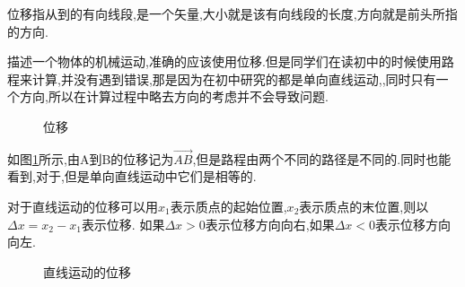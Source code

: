 位移指从到的有向线段,是一个矢量,大小就是该有向线段的长度,方向就是前头所指的方向.

描述一个物体的机械运动,准确的应该使用位移.但是同学们在读初中的时候使用路程来计算,并没有遇到错误,那是因为在初中研究的都是单向直线运动,,同时只有一个方向,所以在计算过程中略去方向的考虑并不会导致问题.

\begin{figure}[H]
  \centering
  \caption{位移}
  \label{fig:displacement}
\end{figure}

如图\ref{fig:displacement}所示,由A到B的位移记为$\overrightarrow{AB}$,但是路程由两个不同的路径是不同的.同时也能看到,对于,但是单向直线运动中它们是相等的.

对于直线运动的位移可以用$x_1$表示质点的起始位置,$x_2$表示质点的末位置,则以$\Delta x=x_2-x_1$表示位移.
如果$\Delta x>0$表示位移方向向右,如果$\Delta x<0$表示位移方向向左.

\begin{figure}[H]
  \centering
  \caption{直线运动的位移}
\end{figure}

